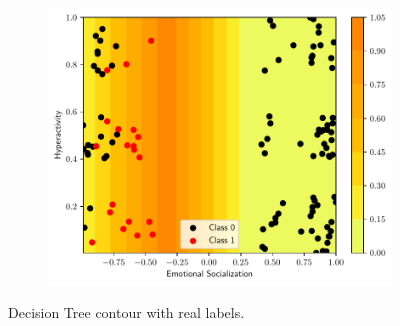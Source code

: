 \documentclass[conference]{IEEEtran}
\theoremstyle{definition}
\theoremstyle{remark}
\theoremstyle{remark}
\begin{document}
\begin{figure}
\begin{subfigure}[b]{0.32\textwidth}
        \includegraphics[width=\textwidth]{figs/tree-contour-2-5.pdf}
        \caption{}
    \end{subfigure}
    \caption{Decision Tree contour with real labels.}
    \label{fig:dts}
\end{figure}
\end{document}
